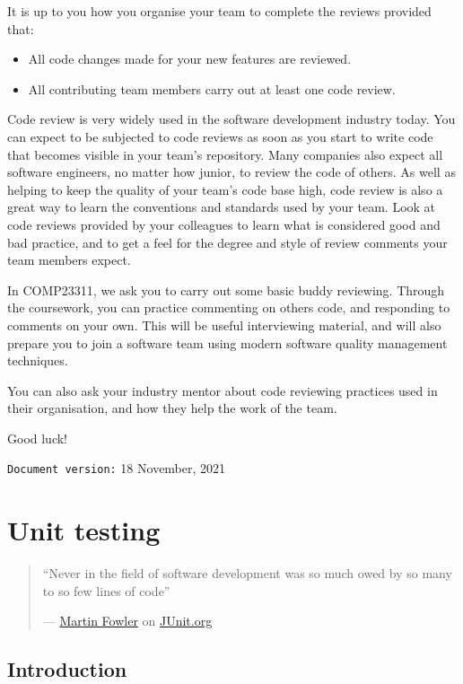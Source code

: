\documentclass[
]{book}
\providecommand{\tightlist}{%
  \setlength{\itemsep}{0pt}\setlength{\parskip}{0pt}}
\begin{document}
It is up to you how you organise your team to complete the reviews provided that:

\begin{itemize}
\tightlist
\item
  All code changes made for your new features are reviewed.
\item
  All contributing team members carry out at least one code review.
\end{itemize}

Code review is very widely used in the software development industry today. You can expect to be subjected to code reviews as soon as you start to write code that becomes visible in your team's repository. Many companies also expect all software engineers, no matter how junior, to review the code of others. As well as helping to keep the quality of your team's code base high, code review is also a great way to learn the conventions and standards used by your team. Look at code reviews provided by your colleagues to learn what is considered good and bad practice, and to get a feel for the degree and style of review comments your team members expect.

In COMP23311, we ask you to carry out some basic buddy reviewing. Through the coursework, you can practice commenting on others code, and responding to comments on your own. This will be useful interviewing material, and will also prepare you to join a software team using modern software quality management techniques.

You can also ask your industry mentor about code reviewing practices used in their organisation, and how they help the work of the team.

Good luck!

\texttt{Document\ version:} 18 November, 2021

\hypertarget{automating}{%
\chapter{Unit testing}\label{automating}}

\begin{quote}
``Never in the field of software development was so much owed by so many to so few lines of code''

--- \href{https://en.wikipedia.org/wiki/Martin_Fowler_(software_engineer)}{Martin Fowler} on \href{https://junit.org/}{JUnit.org}
\end{quote}

\hypertarget{jintro}{%
\section{Introduction}\label{jintro}}
\end{document}
